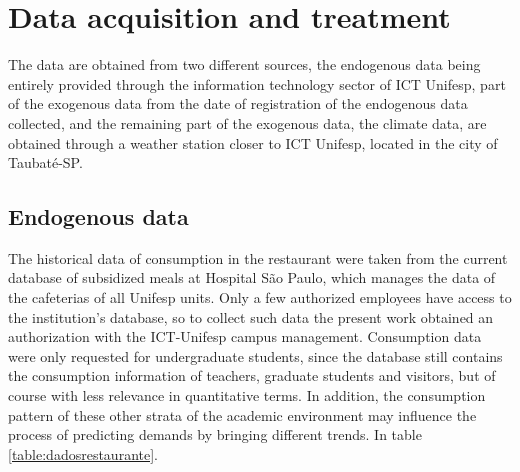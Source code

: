     \section{Data acquisition and treatment}
        The data are obtained from two different sources, the endogenous data being entirely provided through the information technology sector of ICT Unifesp, part of the exogenous data from the date of registration of the endogenous data collected, and the remaining part of the exogenous data, the climate data, are obtained through a weather station closer to ICT Unifesp, located in the city of Taubaté-SP.
        
	    \subsection{Endogenous data} \label{subsec:coleta_endogenos}
        	The historical data of consumption in the restaurant were taken from the current database of subsidized meals at Hospital São Paulo, which manages the data of the cafeterias of all Unifesp units. Only a few authorized employees have access to the institution's database, so to collect such data the present work obtained an authorization with the ICT-Unifesp campus management. Consumption data were only requested for undergraduate students, since the database still contains the consumption information of teachers, graduate students and visitors, but of course with less relevance in quantitative terms. In addition, the consumption pattern of these other strata of the academic environment may influence the process of predicting demands by bringing different trends. In table \ref{table:dadosrestaurante}.
    
